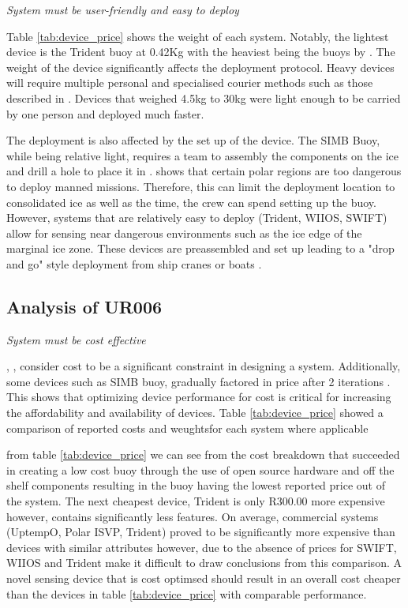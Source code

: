 \textit{System must be  user-friendly and easy to deploy}

Table \ref{tab:device_price} shows the weight of each system. Notably, the lightest device is the  Trident buoy at 0.42Kg with the heaviest being the buoys by \textcite{doble2017robust}. The weight of the device significantly affects the deployment protocol. Heavy devices will require multiple personal and specialised courier methods such as those described in \textcite{doble2017robust}. Devices that weighed 4.5kg to 30kg were light enough to be carried by one person and deployed much faster.

The deployment is also affected by the set up of the device. The SIMB Buoy, while being relative light, requires a team to assembly the components on the ice and drill a hole to place it in \cite{PLANCK2019102792}. \textcite{kennicutt2016delivering} shows that certain polar regions are too dangerous to deploy manned missions. Therefore, this can limit the deployment location to consolidated ice as well as the time, the crew can spend setting up the buoy. However, systems that are relatively easy to deploy (Trident, WIIOS, SWIFT) allow for sensing near dangerous environments such as the ice edge of the marginal ice zone. These devices are preassembled and set up leading to a "drop and go" style deployment from ship cranes \cite{vichi2019effects} \cite{alberello2019drift} or boats \cite{rabault2019open} \cite{kohout2015device}.

\subsection{Analysis of UR006}

\textit{System must be cost effective}

\textcite{PLANCK2019102792}, \textcite{guimaraes2018surface}, \textcite{rabault2019open} consider cost to be a significant constraint in designing a system. Additionally, some devices such as SIMB buoy, gradually factored in price after 2 iterations \cite{planck2019evolution}. This shows that optimizing device performance for cost is critical for increasing the affordability and availability of devices. Table \ref{tab:device_price} showed a comparison of reported costs  and weughtsfor each system where applicable 

 
from table \ref{tab:device_price} we can see from the cost breakdown that \textcite{rabault2019open} succeeded in creating a low cost buoy through the use of open source hardware and off the shelf components resulting in the buoy having the lowest reported price out of the system. The next cheapest device, Trident is only R300.00 more expensive however, contains significantly less features. On average, commercial systems (UptempO, Polar ISVP, Trident) proved to be significantly more expensive than devices with similar attributes however, due to the absence of prices for SWIFT, WIIOS and Trident make it difficult to draw conclusions from this comparison. A novel sensing device that is cost optimsed should result in an overall cost cheaper than the devices in table \ref{tab:device_price} with comparable performance.

